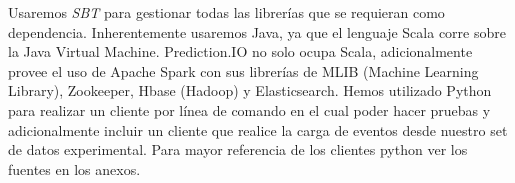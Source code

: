 Usaremos \emph{SBT} para gestionar todas las librerías que se requieran como dependencia. Inherentemente usaremos Java, ya que el lenguaje Scala corre sobre la Java Virtual Machine. Prediction.IO no solo ocupa Scala, adicionalmente provee el uso de Apache Spark con sus librerías de MLIB (Machine Learning Library), Zookeeper, Hbase (Hadoop) y Elasticsearch. Hemos utilizado Python para realizar un cliente por línea de comando en el cual poder hacer pruebas y adicionalmente incluir un cliente que realice la carga de eventos desde nuestro set de datos experimental. Para mayor referencia de los clientes python ver los fuentes en los anexos.












